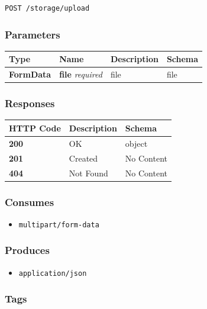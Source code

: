 \begin{verbatim}
POST /storage/upload
\end{verbatim}

\subsubsection{Parameters}\label{parameters-18}

\begin{longtable}[]{@{}llll@{}}
\toprule
Type & Name & Description & Schema\tabularnewline
\midrule
\endhead
\textbf{FormData} & \textbf{file} \emph{required} & file &
file\tabularnewline
\bottomrule
\end{longtable}

\subsubsection{Responses}\label{responses-21}

\begin{longtable}[]{@{}lll@{}}
\toprule
HTTP Code & Description & Schema\tabularnewline
\midrule
\endhead
\textbf{200} & OK & object\tabularnewline
\textbf{201} & Created & No Content\tabularnewline
\textbf{404} & Not Found & No Content\tabularnewline
\bottomrule
\end{longtable}

\subsubsection{Consumes}\label{consumes-9}

\begin{itemize}
\tightlist
\item
  \texttt{multipart/form-data}
\end{itemize}

\subsubsection{Produces}\label{produces-21}

\begin{itemize}
\tightlist
\item
  \texttt{application/json}
\end{itemize}

\subsubsection{Tags}\label{tags-21}

